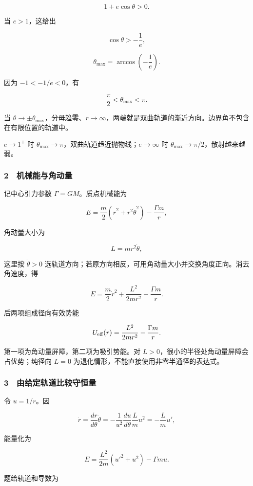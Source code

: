 \documentclass[12pt,a4paper,fontset=fandol]{ctexart}
\begin{document}
\[1+e\cos\theta>0.\]

当 \(e>1\)，这给出

\[\cos\theta>-\frac1e,\]

\[\boxed{\theta_{\max}=\arccos\left(-\frac1e\right).}\]

因为 \(-1<-1/e<0\)，有

\[\boxed{\frac\pi2<\theta_{\max}<\pi.}\]

当
\(\theta\to\pm\theta_{\max}\)，分母趋零、\(r\to\infty\)，两端就是双曲轨道的渐近方向。边界角不包含在有限位置的轨道中。

\(e\to1^+\) 时
\(\theta_{\max}\to\pi\)，双曲轨道趋近抛物线；\(e\to\infty\) 时
\(\theta_{\max}\to\pi/2\)，散射越来越弱。

\subsubsection{2　机械能与角动量}\label{ux673aux68b0ux80fdux4e0eux89d2ux52a8ux91cf}

记中心引力参数 \(\Gamma=GM\)。质点机械能为

\[E=\frac m2(\dot r^2+r^2\dot\theta^2)-\frac{\Gamma m}{r},\]

角动量大小为

\[L=mr^2\dot\theta,\]

这里按 \(\dot\theta>0\)
选轨道方向；若原方向相反，可用角动量大小并交换角度正向。消去角速度，得

\[\boxed{E=\frac m2\dot r^2
+\frac{L^2}{2mr^2}-\frac{\Gamma m}{r}.}\]

后两项组成径向有效势能

\[U_{\rm eff}(r)=\frac{L^2}{2mr^2}-\frac{\Gamma m}{r}.\]

第一项为角动量屏障，第二项为吸引势能。对
\(L>0\)，很小的半径处角动量屏障会占优势；纯径向 \(L=0\)
为退化情形，不能直接使用非零半通径的表达式。

\subsubsection{3　由给定轨道比较守恒量}\label{ux7531ux7ed9ux5b9aux8f68ux9053ux6bd4ux8f83ux5b88ux6052ux91cf}

令 \(u=1/r\)。因

\[\dot r=\frac{dr}{d\theta}\dot\theta
=-\frac1{u^2}\frac{du}{d\theta}\frac Lm u^2
=-\frac Lm u',\]

能量化为

\[E=\frac{L^2}{2m}(u'^2+u^2)-\Gamma m u.\]

题给轨道和导数为
\end{document}
